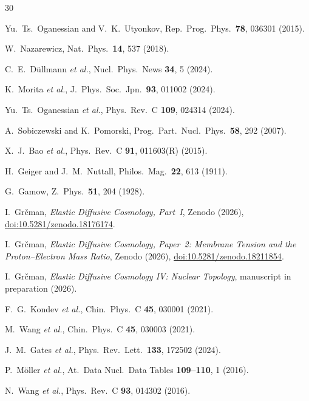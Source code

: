 \documentclass[aps,prc,twocolumn,showpacs,preprintnumbers,amsmath,amssymb]{revtex4-2}
\begin{document}
\begin{thebibliography}{30}

  Yu.~Ts.~Oganessian and V.~K.~Utyonkov,
  Rep.\ Prog.\ Phys.\ \textbf{78}, 036301 (2015).

  W.~Nazarewicz,
  Nat.\ Phys.\ \textbf{14}, 537 (2018).

  C.~E.~D\"ullmann \emph{et al.},
  Nucl.\ Phys.\ News \textbf{34}, 5 (2024).

  K.~Morita \emph{et al.},
  J.\ Phys.\ Soc.\ Jpn.\ \textbf{93}, 011002 (2024).

  Yu.~Ts.~Oganessian \emph{et al.},
  Phys.\ Rev.\ C \textbf{109}, 024314 (2024).

  A.~Sobiczewski and K.~Pomorski,
  Prog.\ Part.\ Nucl.\ Phys.\ \textbf{58}, 292 (2007).

  X.~J.~Bao \emph{et al.},
  Phys.\ Rev.\ C \textbf{91}, 011603(R) (2015).

  H.~Geiger and J.~M.~Nuttall,
  Philos.\ Mag.\ \textbf{22}, 613 (1911).

  G.~Gamow,
  Z.\ Phys.\ \textbf{51}, 204 (1928).

  I.~Gr\v{c}man,
  \emph{Elastic Diffusive Cosmology, Part~I},
  Zenodo (2026),
  \href{https://doi.org/10.5281/zenodo.18176174}{doi:10.5281/zenodo.18176174}.

  I.~Gr\v{c}man,
  \emph{Elastic Diffusive Cosmology, Paper~2: Membrane Tension
    and the Proton--Electron Mass Ratio},
  Zenodo (2026),
  \href{https://doi.org/10.5281/zenodo.18211854}{doi:10.5281/zenodo.18211854}.

  I.~Gr\v{c}man,
  \emph{Elastic Diffusive Cosmology IV: Nuclear Topology},
  manuscript in preparation (2026).

  F.~G.~Kondev \emph{et al.},
  Chin.\ Phys.\ C \textbf{45}, 030001 (2021).

  M.~Wang \emph{et al.},
  Chin.\ Phys.\ C \textbf{45}, 030003 (2021).

  J.~M.~Gates \emph{et al.},
  Phys.\ Rev.\ Lett.\ \textbf{133}, 172502 (2024).

  P.~M\"oller \emph{et al.},
  At.\ Data Nucl.\ Data Tables \textbf{109--110}, 1 (2016).

  N.~Wang \emph{et al.},
  Phys.\ Rev.\ C \textbf{93}, 014302 (2016).


\end{thebibliography}
\end{document}
